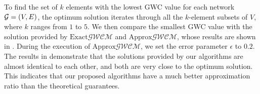 \documentclass[10pt,twocolumn,twoside]{IEEEtran}
\begin{document}
To find the set of \(k\) elements with the lowest GWC value for each network \(\mathcal{G}=(V,E)\), the optimum solution iterates through all the \(k\)-element subsets of \(V\), where \(k\) ranges from \(1\) to \(5\).
We then compare the smallest GWC value with the solution provided by \(\text{Exact}\mathcal{GWCM}\) and \(\text{Approx}\mathcal{GWCM}\), whose results are shown in .
During the execution of \(\text{Approx}\mathcal{GWCM}\), we set the error parameter \(\epsilon\) to \(0.2\).
The results in  demonstrate that the solutions provided by our algorithms are almost identical to each other, and both are very close to the optimum solution.
This indicates that our proposed algorithms have a much better approximation ratio than the theoretical guarantees.
\end{document}
